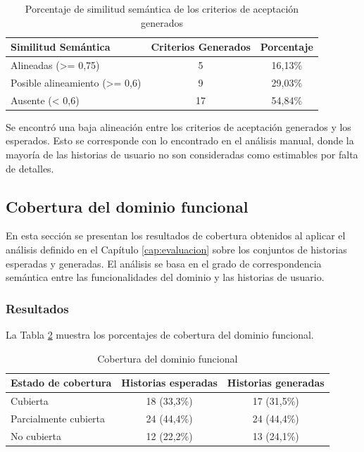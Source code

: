 \begin{table}[htb]
\centering
\begin{tabular}{|l|c|c|}
\hline
\textbf{Similitud Semántica} & \textbf{Criterios Generados} & \textbf{Porcentaje} \\
\hline
Alineadas  (>= 0,75) & 5  & 16,13\%  \\
Posible alineamiento (>= 0,6) & 9 & 29,03\% \\
Ausente (< 0,6)& 17 & 54,84\% \\
\hline
\end{tabular}
\caption{Porcentaje de similitud semántica de los criterios de aceptación generados}
\label{tab:ca_estados}
\end{table}

Se encontró una baja alineación entre los criterios de aceptación generados y los esperados. Esto se corresponde con lo encontrado en el análisis manual, donde la mayoría de las historias de usuario no son consideradas como estimables por falta de detalles.

\subsection{Cobertura del dominio funcional}
En esta sección se presentan los resultados de cobertura obtenidos al aplicar el análisis definido en el Capítulo \ref{cap:evaluacion} sobre los conjuntos de historias esperadas y generadas. El análisis se basa en el grado de correspondencia semántica entre las funcionalidades del dominio y las historias de usuario.

\subsubsection{Resultados}
La Tabla \ref{tab:cobertura_funcional} muestra los porcentajes de cobertura del dominio funcional.

\begin{table}[h!]
\centering
\begin{tabular}{|l|c|c|}
\hline
\textbf{Estado de cobertura} & \textbf{Historias esperadas} & \textbf{Historias generadas} \\ 
\hline
Cubierta & 18 (33,3\%) & 17 (31,5\%) \\
Parcialmente cubierta & 24 (44,4\%) & 24 (44,4\%) \\
No cubierta & 12 (22,2\%) & 13 (24,1\%) \\
\hline
\end{tabular}
\caption{Cobertura del dominio funcional}
\label{tab:cobertura_funcional}
\end{table}

